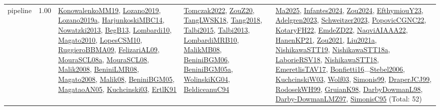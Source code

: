 {\begin{longtable}{p{3cm}r>{\raggedright\arraybackslash}p{6cm}>{\raggedright\arraybackslash}p{6cm}>{\raggedright\arraybackslash}p{8cm}}
\index{pipeline}\index{ApplicationAreas!pipeline}pipeline &  1.00 & \hyperref[detail:KonowalenkoMM19]{KonowalenkoMM19}, \hyperref[detail:Lozano2019]{Lozano2019}, \hyperref[detail:Lozano2019a]{Lozano2019a}, \hyperref[detail:HarjunkoskiMBC14]{HarjunkoskiMBC14}, \hyperref[detail:Nowatzki2013]{Nowatzki2013}, \hyperref[detail:BegB13]{BegB13}, \hyperref[detail:Lombardi10]{Lombardi10}, \hyperref[detail:Magato2010]{Magato2010}, \hyperref[detail:LopesCSM10]{LopesCSM10}, \hyperref[detail:RuggieroBBMA09]{RuggieroBBMA09}, \hyperref[detail:FelizariAL09]{FelizariAL09}, \hyperref[detail:MouraSCL08a]{MouraSCL08a}, \hyperref[detail:MouraSCL08]{MouraSCL08}, \hyperref[detail:Malik2008]{Malik2008}, \hyperref[detail:BeniniLMR08]{BeniniLMR08}, \hyperref[detail:Magato2008]{Magato2008}, \hyperref[detail:Malik08]{Malik08}, \hyperref[detail:BeniniBGM05]{BeniniBGM05}, \hyperref[detail:MagataoAN05]{MagataoAN05}, \hyperref[detail:Kuchcinski03]{Kuchcinski03}, \hyperref[detail:ErtlK91]{ErtlK91} & \hyperref[detail:Tomczak2022]{Tomczak2022}, \hyperref[detail:ZouZ20]{ZouZ20}, \hyperref[detail:TangLWSK18]{TangLWSK18}, \hyperref[detail:Tang2018]{Tang2018}, \hyperref[detail:Talbi2015]{Talbi2015}, \hyperref[detail:Talbi2013]{Talbi2013}, \hyperref[detail:LombardiMRB10]{LombardiMRB10}, \hyperref[detail:MalikMB08]{MalikMB08}, \hyperref[detail:BeniniBGM06]{BeniniBGM06}, \hyperref[detail:BeniniBGM05a]{BeniniBGM05a}, \hyperref[detail:WolinskiKG04]{WolinskiKG04}, \hyperref[detail:BeldiceanuC94]{BeldiceanuC94} & \hyperref[detail:Ma2025]{Ma2025}, \hyperref[detail:Infantes2024]{Infantes2024}, \hyperref[detail:Zou2024]{Zou2024}, \hyperref[detail:EfthymiouY23]{EfthymiouY23}, \hyperref[detail:Adelgren2023]{Adelgren2023}, \hyperref[detail:Schweitzer2023]{Schweitzer2023}, \hyperref[detail:PopovicCGNC22]{PopovicCGNC22}, \hyperref[detail:KotaryFH22]{KotaryFH22}, \hyperref[detail:EmdeZD22]{EmdeZD22}, \hyperref[detail:NaqviAIAAA22]{NaqviAIAAA22}, \hyperref[detail:HanenKP21]{HanenKP21}, \hyperref[detail:Zou2021]{Zou2021}, \hyperref[detail:Liu2021a]{Liu2021a}, \hyperref[detail:NishikawaSTT19]{NishikawaSTT19}, \hyperref[detail:NishikawaSTT18a]{NishikawaSTT18a}, \hyperref[detail:LaborieRSV18]{LaborieRSV18}, \hyperref[detail:NishikawaSTT18]{NishikawaSTT18}, \hyperref[detail:EmeretlisTAV17]{EmeretlisTAV17}, \hyperref[detail:Bonfietti16]{Bonfietti16}...\hyperref[detail:Stebel2006]{Stebel2006}, \hyperref[detail:KuchcinskiW03]{KuchcinskiW03}, \hyperref[detail:Wolf03]{Wolf03}, \hyperref[detail:Simonis99]{Simonis99}, \hyperref[detail:DraperJCJ99]{DraperJCJ99}, \hyperref[detail:RodosekWH99]{RodosekWH99}, \hyperref[detail:GruianK98]{GruianK98}, \hyperref[detail:DarbyDowmanL98]{DarbyDowmanL98}, \hyperref[detail:Darby-DowmanLMZ97]{Darby-DowmanLMZ97}, \hyperref[detail:SimonisC95]{SimonisC95} (Total: 52)\\

\end{longtable}}
